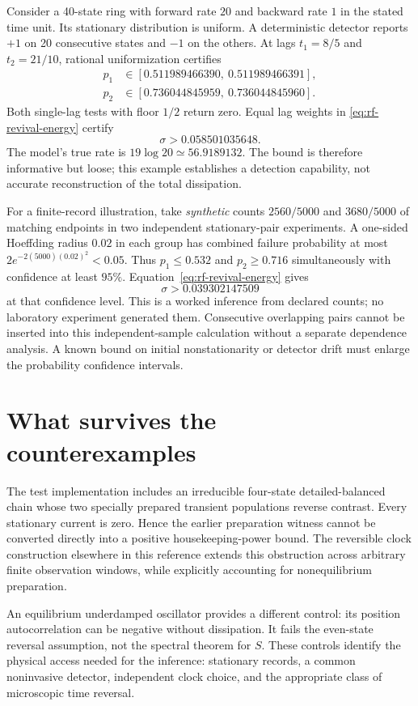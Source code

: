 Consider a 40-state ring with forward rate $20$ and backward rate $1$ in
the stated time unit. Its stationary distribution is uniform. A deterministic
detector reports $+1$ on 20 consecutive states and $-1$ on the others.
At lags $t_1=8/5$ and $t_2=21/10$, rational uniformization certifies
\begin{align*}
 p_1&\in[0.511989466390,\ 0.511989466391],\\
 p_2&\in[0.736044845959,\ 0.736044845960].
\end{align*}
Both single-lag tests with floor $1/2$ return zero. Equal lag weights in
\eqref{eq:rf-revival-energy} certify
\[
 \sigma>0.058501035648.
\]
The model's true rate is $19\log20\simeq56.9189132$. The bound is therefore
informative but loose; this example establishes a detection capability,
not accurate reconstruction of the total dissipation.

For a finite-record illustration, take \emph{synthetic} counts
$2560/5000$ and $3680/5000$ of matching endpoints in two independent
stationary-pair experiments. A one-sided Hoeffding radius $0.02$ in each
group has combined failure probability at most
$2e^{-2(5000)(0.02)^2}<0.05$. Thus
$p_1\le0.532$ and $p_2\ge0.716$ simultaneously with confidence at least
$95\%$. Equation~\eqref{eq:rf-revival-energy} gives
\[
 \sigma>0.039302147509
\]
at that confidence level. This is a worked inference from declared counts;
no laboratory experiment generated them. Consecutive overlapping pairs
cannot be inserted into this independent-sample calculation without a
separate dependence analysis. A known bound on initial nonstationarity or
detector drift must enlarge the probability confidence intervals.

\section{What survives the counterexamples}

The test implementation includes an irreducible four-state detailed-balanced
chain whose two specially prepared transient populations reverse contrast.
Every stationary current is zero. Hence the earlier preparation witness
cannot be converted directly into a positive housekeeping-power bound.
The reversible clock construction elsewhere in this reference extends this
obstruction across arbitrary finite observation windows, while explicitly
accounting for nonequilibrium preparation.

An equilibrium underdamped oscillator provides a different control:
its position autocorrelation can be negative without dissipation. It fails
the even-state reversal assumption, not the spectral theorem for $S$.
These controls identify the physical access needed for the inference:
stationary records, a common noninvasive detector, independent clock choice,
and the appropriate class of microscopic time reversal.


